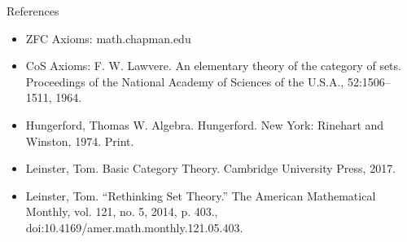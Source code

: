 \documentclass[12pt]{beamer}
\begin{document}
\begin{frame}{References}
    \begin{itemize}
        \item ZFC Axioms: math.chapman.edu
    
        \item CoS Axioms: F. W. Lawvere. An elementary theory of the category of sets. Proceedings of the National Academy of Sciences of the U.S.A., 52:1506– 1511, 1964. 
        
        \item Hungerford, Thomas W. Algebra. Hungerford. New York: Rinehart and Winston, 1974. Print.
        
        \item Leinster, Tom. Basic Category Theory. Cambridge University Press, 2017.
        
        \item Leinster, Tom. “Rethinking Set Theory.” The American Mathematical Monthly, vol. 121, no. 5, 2014, p. 403., doi:10.4169/amer.math.monthly.121.05.403.
    \end{itemize}
    
\end{frame}
\end{document}
